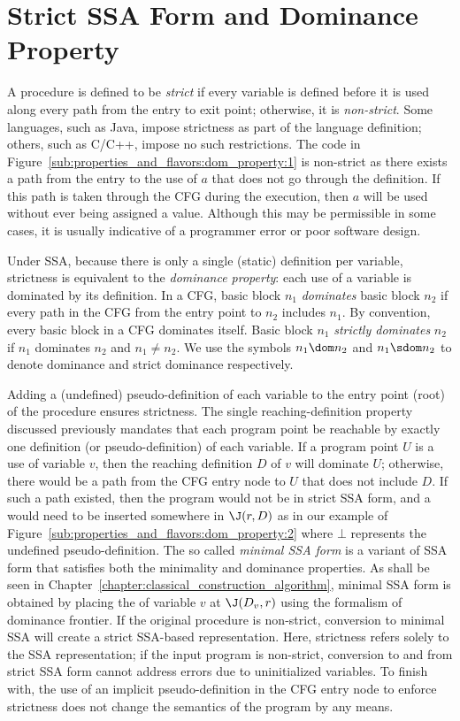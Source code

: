 \section{Strict SSA Form and Dominance Property}
\label{sec:properties_and_flavours:domprop}
A procedure is defined to be \emph{strict} if every variable
is defined before it is used along every path from the entry
to exit point; otherwise, it is \emph{non-strict}.
Some languages, such as Java, impose strictness as part of the language
definition; others, such as C/C++, impose no such restrictions. 
The code in Figure~\ref{sub:properties_and_flavors:dom_property:1} is non-strict as there exists a path from the entry to the use of $a$ that does not go through the definition. 
If this path is taken through the CFG during the execution, then $a$ will be used without ever
being assigned a value. Although this may be permissible in
some cases, it is usually indicative of a programmer error or poor software design. 

Under SSA, because there is only a single
(static) definition per variable, strictness is equivalent to the
\emph{dominance property}: each use of a variable is dominated by
its definition.
In a CFG, basic block $n_{1}$ \emph{dominates} basic block $n_{2}$
if every path in the CFG from the entry point to $n_{2}$ includes
$n_{1}$. By convention, every basic block in a CFG dominates itself. Basic 
block $n_{1}$ \emph{strictly dominates} $n_{2}$ if $n_{1}$ dominates
$n_{2}$ and $n_{1} \neq n_{2}$. We use the symbols $n_{1} \dom n_{2}$
and $n_{1} \sdom n_{2}$ to denote dominance and strict dominance 
respectively.


Adding a (undefined) pseudo-definition of each variable to the entry
point (root) of the procedure ensures strictness. 
The single reaching-definition property discussed previously mandates that each
program point be reachable by exactly one definition (or pseudo-definition)
of each variable. If a program point $U$ is a use of variable $v$, then the
reaching definition $D$ of $v$ will dominate $U$; otherwise, there would be a path
from the CFG entry node to $U$ that does not include $D$. If such a  path existed, then the program would not be in strict SSA form, and a \phifun would need to be inserted somewhere
in $\J(r,D)$ as in our example of Figure~\ref{sub:properties_and_flavors:dom_property:2} where $\bot$ represents the undefined pseudo-definition. The so called \emph{minimal SSA form} is a variant of SSA form that satisfies both the minimality and dominance properties. As shall be seen in Chapter~\ref{chapter:classical_construction_algorithm}, minimal SSA form is obtained by placing the \phifuns of variable $v$ at $\J(D_v,r)$ using the formalism of dominance frontier.
If the original procedure is non-strict, conversion to minimal SSA
will create a strict SSA-based representation. Here, strictness refers
solely to the SSA representation; if the input program is non-strict,
conversion to and from strict SSA form cannot address errors due
to uninitialized variables. To finish with, the use of an implicit pseudo-definition in the CFG entry node to enforce strictness does not change the semantics of the program by any means.


